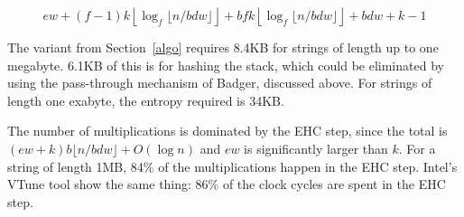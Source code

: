 \documentclass[runningheads]{llncs}
\begin{document}
\[
e w
+ (f-1) k \left\lfloor\log_f \lfloor n/b d w\rfloor\right\rfloor
+ b f k \left\lfloor\log_f \lfloor n/b d w\rfloor\right\rfloor
+ b d w + k - 1
\]

The variant from Section~\ref{algo} requires 8.4KB for strings of length up to one megabyte.
6.1KB of this is for hashing the stack, which could be eliminated by using the pass-through mechanism of Badger, discussed above.
For strings of length one exabyte, the entropy required is 34KB.

The number of multiplications is dominated by the EHC step, since the total is $(e w + k) b \lfloor n / b d w \rfloor + O(\log n)$ and $e w$ is significantly larger than $k$.
For a string of length 1MB, 84\% of the multiplications happen in the EHC step. %
Intel's VTune tool show the same thing: 86\% of the clock cycles are spent in the EHC step.






\end{document}
